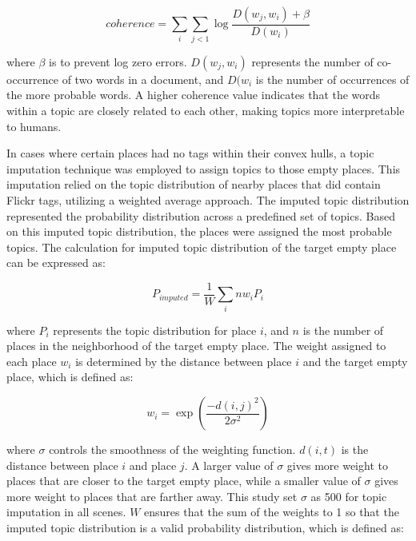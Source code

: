 \documentclass{article}
\theoremstyle{definition}
\theoremstyle{remark}
\begin{document}
\begin{equation} \label{eq:coherence_value}
    coherence = \sum_{i}\sum_{j<1}\log\frac{D(w_{j},w_{i})+\beta}{D(w_{i})}
\end{equation}

where $\beta$ is to prevent log zero errors. $D(w_{j},w_{i})$ represents the number of co-occurrence of two words in a document, and $D(w_{i}$ is the number of occurrences of the more probable words. A higher coherence value indicates that the words within a topic are closely related to each other, making topics more interpretable to humans.

In cases where certain places had no tags within their convex hulls, a topic imputation technique was employed to assign topics to those empty places. This imputation relied on the topic distribution of nearby places that did contain Flickr tags, utilizing a weighted average approach. The imputed topic distribution represented the probability distribution across a predefined set of topics. Based on this imputed topic distribution, the places were assigned the most probable topics. The calculation for imputed topic distribution of the target empty place can be expressed as:

\begin{equation} \label{eq:topic_imputation}
    P_{imputed} = \frac{1}{W}\sum_{i}{n}w_{i}P_{i}
\end{equation}

where $P_{i}$ represents the topic distribution for place $i$, and $n$ is the number of places in the neighborhood of the target empty place. The weight assigned to each place $w_{i}$ is determined by the distance between place $i$ and the target empty place, which is defined as:

\begin{equation} \label{eq:topic_imputation_w_i}
    w_{i} = \exp(\frac{-d(i,j)^2}{2\sigma^2})
\end{equation}

where $\sigma$ controls the smoothness of the weighting function. $d(i,t)$ is the distance between place $i$ and place $j$. A larger value of $\sigma$ gives more weight to places that are closer to the target empty place, while a smaller value of $\sigma$ gives more weight to places that are farther away. This study set $\sigma$ as 500 for topic imputation in all scenes. $W$ ensures that the sum of the weights to 1 so that the imputed topic distribution is a valid probability distribution, which is defined as:
\end{document}

